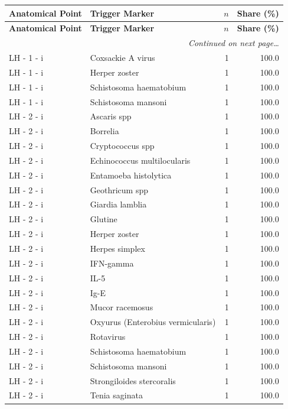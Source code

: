 \documentclass[a4paper,11pt]{article}
\begin{document}
\begin{footnotesize}
\begin{longtable}{p{3.5cm}p{7.5cm}rr}
\toprule
\textbf{Anatomical Point} &
\textbf{Trigger Marker} &
\textbf{$n$} &
\textbf{Share (\%)} \\
\midrule
\endfirsthead
\toprule
\textbf{Anatomical Point} &
\textbf{Trigger Marker} &
\textbf{$n$} &
\textbf{Share (\%)} \\
\midrule
\endhead
\midrule
\multicolumn{4}{r}{\footnotesize\emph{Continued on next page\ldots}} \\
\endfoot
\bottomrule
\endlastfoot
LH - 1 - i & Coxsackie A virus & 1 & 100.0 \\
LH - 1 - i & Herper zoster & 1 & 100.0 \\
LH - 1 - i & Schistosoma haematobium & 1 & 100.0 \\
LH - 1 - i & Schistosoma mansoni & 1 & 100.0 \\
LH - 2 - i & Ascaris spp & 1 & 100.0 \\
LH - 2 - i & Borrelia & 1 & 100.0 \\
LH - 2 - i & Cryptococcus spp & 1 & 100.0 \\
LH - 2 - i & Echinococcus multilocularis & 1 & 100.0 \\
LH - 2 - i & Entamoeba histolytica & 1 & 100.0 \\
LH - 2 - i & Geothricum spp & 1 & 100.0 \\
LH - 2 - i & Giardia lamblia & 1 & 100.0 \\
LH - 2 - i & Glutine & 1 & 100.0 \\
LH - 2 - i & Herper zoster & 1 & 100.0 \\
LH - 2 - i & Herpes simplex & 1 & 100.0 \\
LH - 2 - i & IFN-gamma & 1 & 100.0 \\
LH - 2 - i & IL-5 & 1 & 100.0 \\
LH - 2 - i & Ig-E & 1 & 100.0 \\
LH - 2 - i & Mucor racemosus & 1 & 100.0 \\
LH - 2 - i & Oxyurus (Enterobius vermicularis) & 1 & 100.0 \\
LH - 2 - i & Rotavirus & 1 & 100.0 \\
LH - 2 - i & Schistosoma haematobium & 1 & 100.0 \\
LH - 2 - i & Schistosoma mansoni & 1 & 100.0 \\
LH - 2 - i & Strongiloides stercoralis & 1 & 100.0 \\
LH - 2 - i & Tenia saginata & 1 & 100.0 \\

\end{longtable}
\end{footnotesize}
\end{document}
